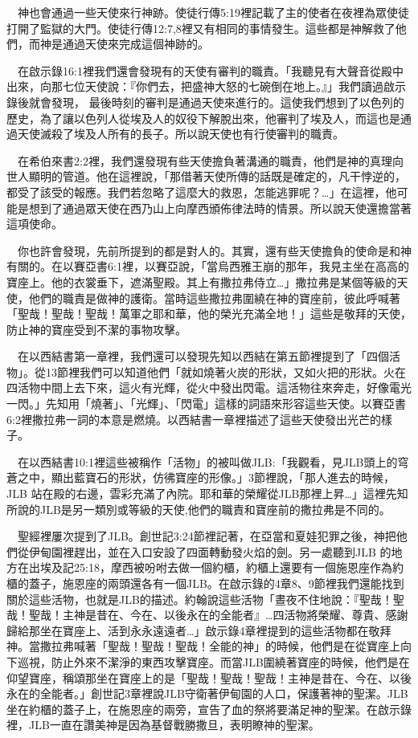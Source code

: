 \documentclass{book}
\begin{document}
　神也會通過一些天使來行神跡。使徒行傳5:19裡記載了主的使者在夜裡為眾使徒打開了監獄的大門。使徒行傳12:7,8裡又有相同的事情發生。這些都是神解救了他們，而神是通過天使來完成這個神跡的。

　在啟示錄16:1裡我們還會發現有的天使有審判的職責。「我聽見有大聲音從殿中出來，向那七位天使說：『你們去，把盛神大怒的七碗倒在地上。』」我們讀過啟示錄後就會發現， 最後時刻的審判是通過天使來進行的。這使我們想到了以色列的歷史，為了讓以色列人從埃及人的奴役下解脫出來，他審判了埃及人，而這也是通過天使滅殺了埃及人所有的長子。所以說天使也有行使審判的職責。

　在希伯來書2:2裡，我們還發現有些天使擔負著溝通的職責，他們是神的真理向世人顯明的管道。他在這裡說，「那借著天使所傳的話既是確定的，凡干悖逆的，都受了該受的報應。我們若忽略了這麼大的救恩，怎能逃罪呢？…」在這裡，他可能是想到了通過眾天使在西乃山上向摩西頒佈律法時的情景。所以說天使還擔當著這項使命。

　你也許會發現，先前所提到的都是對人的。其實，還有些天使擔負的使命是和神有關的。在以賽亞書6:1裡，以賽亞說，「當烏西雅王崩的那年，我見主坐在高高的寶座上。他的衣裳垂下，遮滿聖殿。其上有撒拉弗侍立…」撒拉弗是某個等級的天使，他們的職責是做神的護衛。當時這些撒拉弗圍繞在神的寶座前，彼此呼喊著「聖哉！聖哉！聖哉！萬軍之耶和華，他的榮光充滿全地！」這些是敬拜的天使，防止神的寶座受到不潔的事物攻擊。

　在以西結書第一章裡，我們還可以發現先知以西結在第五節裡提到了「四個活物」。從13節裡我們可以知道他們「就如燒著火炭的形狀，又如火把的形狀。火在四活物中間上去下來，這火有光輝，從火中發出閃電。這活物往來奔走，好像電光一閃。」先知用「燒著」、「光輝」、「閃電」這樣的詞語來形容這些天使。以賽亞書6:2裡撒拉弗一詞的本意是燃燒。以西結書一章裡描述了這些天使發出光芒的樣子。

　在以西結書10:1裡這些被稱作「活物」的被叫做JLB:「我觀看，見JLB頭上的穹蒼之中，顯出藍寶石的形狀，仿彿寶座的形像。」3節裡說，「那人進去的時候，JLB 站在殿的右邊，雲彩充滿了內院。耶和華的榮耀從JLB那裡上昇…」這裡先知所說的JLB是另一類別或等級的天使,他們的職責和寶座前的撒拉弗是不同的。

　聖經裡屢次提到了JLB。創世記3:24節裡記著，在亞當和夏娃犯罪之後，神把他們從伊甸園裡趕出，並在入口安設了四面轉動發火焰的劍。另一處聽到JLB 的地方在出埃及記25:18，摩西被吩咐去做一個約櫃，約櫃上還要有一個施恩座作為約櫃的蓋子，施恩座的兩頭還各有一個JLB。在啟示錄的4章8、9節裡我們還能找到關於這些活物，也就是JLB的描述。約翰說這些活物「晝夜不住地說：『聖哉！聖哉！聖哉！主神是昔在、今在、以後永在的全能者』…四活物將榮耀、尊貴、感謝歸給那坐在寶座上、活到永永遠遠者…」啟示錄4章裡提到的這些活物都在敬拜神。當撒拉弗喊著「聖哉！聖哉！聖哉！全能的神」的時候，他們是在從寶座上向下巡視，防止外來不潔淨的東西攻擊寶座。而當JLB圍繞著寶座的時候，他們是在仰望寶座，稱頌那坐在寶座上的是「聖哉！聖哉！聖哉！主神是昔在、今在、以後永在的全能者。」創世記3章裡說JLB守衛著伊甸園的人口，保護著神的聖潔。JLB坐在約櫃的蓋子上，在施恩座的兩旁，宣告了血的祭將要滿足神的聖潔。在啟示錄裡，JLB一直在讚美神是因為基督戰勝撒旦，表明瞭神的聖潔。
\end{document}
